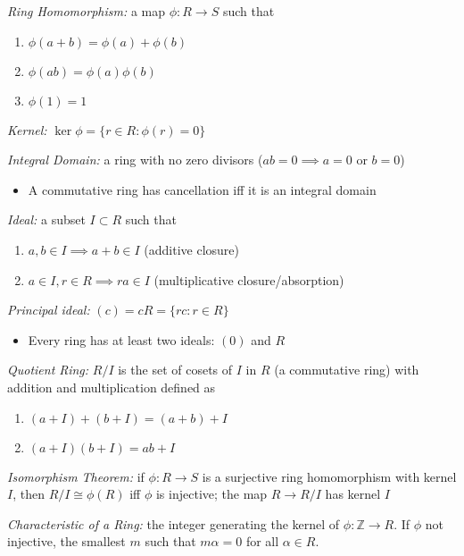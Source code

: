 \documentclass[9pt]{memoir}
\newcommand{\Z}{\mathbb{Z}}
\begin{document}
\begin{multicols}{2}
    \emph{Ring Homomorphism:} a map $\phi: R \to S$ such that 
    \begin{enumerate}
        \item $\phi(a + b) = \phi(a) + \phi(b)$
        \item $\phi(ab) = \phi(a)\phi(b)$
        \item $\phi(1) = 1$
    \end{enumerate}

    \emph{Kernel:} $\ker \phi = \{r \in R : \phi(r) = 0\}$

    \emph{Integral Domain:} a ring with no zero divisors ($ab = 0 \implies a = 0$ or $b = 0$)
    \begin{itemize}
        \item A commutative ring has cancellation iff it is an integral domain
    \end{itemize}

    \emph{Ideal:} a subset $I \subset R$ such that
    \begin{enumerate}
        \item $a, b \in I \implies a + b \in I$ (additive closure)
        \item $a \in I, r \in R \implies ra \in I$ (multiplicative closure/absorption)
    \end{enumerate}

    \emph{Principal ideal:} $(c) = cR = \{rc : r \in R\}$
    \begin{itemize}
        \item Every ring has at least two ideals: $(0)$ and $R$
    \end{itemize}

    \emph{Quotient Ring:} $R/I$ is the set of cosets of $I$ in $R$ (a commutative ring) with addition and multiplication defined as
    \begin{enumerate}
        \item $(a + I) + (b + I) = (a + b) + I$
        \item $(a + I)(b + I) = ab + I$
    \end{enumerate}

    \emph{Isomorphism Theorem:} if $\phi: R \to S$ is a surjective ring homomorphism with kernel $I$, then $R/I \cong \phi(R)$ iff $\phi$ is injective; the map $R \to R/I$ has kernel $I$
   
    \emph{Characteristic of a Ring:} the integer generating the kernel of $\phi: \Z \to R$. If $\phi$ not injective, the smallest $m$ such that $m\alpha = 0$ for all $\alpha \in R$. 


\end{multicols}
\end{document}
